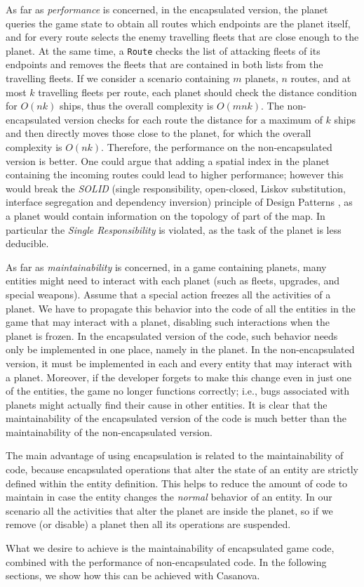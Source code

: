 As far as \emph{performance} is concerned, in the encapsulated version, the planet queries the game state to obtain all routes which endpoints are the planet itself, and for every route selects the enemy travelling fleets that are close enough to the planet. At the same time, a \texttt{Route} checks the list of attacking fleets of its endpoints and removes the fleets that are contained in both lists from the travelling fleets. If we consider a scenario containing $m$ planets, $n$ routes, and at most $k$ travelling fleets per route, each planet should check the distance condition for $O(nk)$ ships, thus the overall complexity is $O(mnk)$. The non-encapsulated version checks for each route the distance for a maximum of $k$ ships and then directly moves those close to the planet, for which the overall complexity is $O(nk)$. Therefore, the performance on the non-encapsulated version is better. One could argue that adding a spatial index in the planet containing the incoming routes could lead to higher performance; however this would break the \textit{SOLID} (single responsibility, open-closed, Liskov substitution, interface segregation and dependency inversion) principle of Design Patterns \cite{martin2003agile}, as a planet would contain information on the topology of part of the map. In particular the \textit{Single Responsibility} is violated, as the task of the planet is less deducible.

As far as \emph{maintainability} is concerned, in a game containing planets, many entities might need to interact with each planet (such as fleets, upgrades, and special weapons). Assume that a special action freezes all the activities of a planet. We have to propagate this behavior into the code of all the entities in the game that may interact with a planet, disabling such interactions when the planet is frozen. In the encapsulated version of the code, such behavior needs only be implemented in one place, namely in the planet. In the non-encapsulated version, it must be implemented in each and every entity that may interact with a planet. Moreover, if the developer forgets to make this change even in just one of the entities, the game no longer functions correctly; i.e., bugs associated with planets might actually find their cause in other entities. It is clear that the maintainability of the encapsulated version of the code is much better than the maintainability of the non-encapsulated version.

The main advantage of using encapsulation is related to the maintainability of code, because encapsulated operations that alter the state of an entity are strictly defined within the entity definition. This helps to reduce the amount of code to maintain in case the entity changes the \textit{normal} behavior of an entity. In our scenario all the activities that alter the planet are inside the planet, so if we remove (or disable) a planet then all its operations are suspended.

What we desire to achieve is the maintainability of encapsulated game code, combined with the performance of non-encapsulated code. In the following sections, we show how this can be achieved with Casanova. 